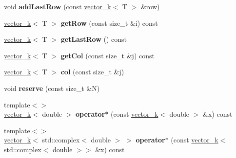 \begin{DoxyCompactItemize}
\item 
\hypertarget{classkeycpp_1_1matrix_a5cbaeebb6b9c8d87656728c8f2183119}{void {\bfseries add\-Last\-Row} (const \hyperlink{classkeycpp_1_1vector__k}{vector\-\_\-k}$<$ T $>$ \&row)}\label{classkeycpp_1_1matrix_a5cbaeebb6b9c8d87656728c8f2183119}

\item 
\hypertarget{classkeycpp_1_1matrix_a6f237ab7b8559f85f0279d2411b6e9fa}{\hyperlink{classkeycpp_1_1vector__k}{vector\-\_\-k}$<$ T $>$ {\bfseries get\-Row} (const size\-\_\-t \&i) const }\label{classkeycpp_1_1matrix_a6f237ab7b8559f85f0279d2411b6e9fa}

\item 
\hypertarget{classkeycpp_1_1matrix_aa37578e0da4d4f7531feed0627846a5a}{\hyperlink{classkeycpp_1_1vector__k}{vector\-\_\-k}$<$ T $>$ {\bfseries get\-Last\-Row} () const }\label{classkeycpp_1_1matrix_aa37578e0da4d4f7531feed0627846a5a}

\item 
\hypertarget{classkeycpp_1_1matrix_ac930da1cf8a44eb685d565288c28f731}{\hyperlink{classkeycpp_1_1vector__k}{vector\-\_\-k}$<$ T $>$ {\bfseries get\-Col} (const size\-\_\-t \&j) const }\label{classkeycpp_1_1matrix_ac930da1cf8a44eb685d565288c28f731}

\item 
\hypertarget{classkeycpp_1_1matrix_a65e7a0716a3da9359c9db6d2e88447be}{\hyperlink{classkeycpp_1_1vector__k}{vector\-\_\-k}$<$ T $>$ {\bfseries col} (const size\-\_\-t \&j)}\label{classkeycpp_1_1matrix_a65e7a0716a3da9359c9db6d2e88447be}

\item 
\hypertarget{classkeycpp_1_1matrix_a54b4b47a34e9946ff4f98995f20408a8}{void {\bfseries reserve} (const size\-\_\-t \&N)}\label{classkeycpp_1_1matrix_a54b4b47a34e9946ff4f98995f20408a8}

\item 
\hypertarget{classkeycpp_1_1matrix_a83c99c62f50eca6f4ddee84bc48ebdbc}{{\footnotesize template$<$$>$ }\\\hyperlink{classkeycpp_1_1vector__k}{vector\-\_\-k}$<$ double $>$ {\bfseries operator$\ast$} (const \hyperlink{classkeycpp_1_1vector__k}{vector\-\_\-k}$<$ double $>$ \&x) const}\label{classkeycpp_1_1matrix_a83c99c62f50eca6f4ddee84bc48ebdbc}

\item 
\hypertarget{classkeycpp_1_1matrix_a472df909e5b8722de11df74046817db9}{{\footnotesize template$<$$>$ }\\\hyperlink{classkeycpp_1_1vector__k}{vector\-\_\-k}$<$ std\-::complex$<$ double $>$ $>$ {\bfseries operator$\ast$} (const \hyperlink{classkeycpp_1_1vector__k}{vector\-\_\-k}$<$ std\-::complex$<$ double $>$$>$ \&x) const}\label{classkeycpp_1_1matrix_a472df909e5b8722de11df74046817db9}


\end{DoxyCompactItemize}

